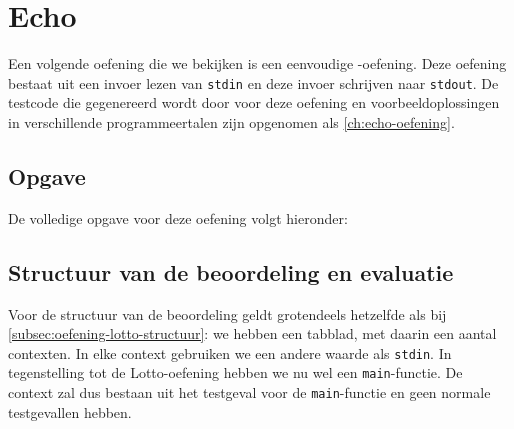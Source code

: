 \inputminted[firstline=6,lastline=50,gobble=8]{json}{sources/lotto-plan.tson}

\section{Echo}\label{sec:oefening-echo}

Een volgende oefening die we bekijken is een eenvoudige -oefening.
Deze oefening bestaat uit een invoer lezen van \texttt{stdin} en deze invoer schrijven naar \texttt{stdout}.
De testcode die gegenereerd wordt door \tested{} voor deze oefening en voorbeeldoplossingen in verschillende programmeertalen zijn opgenomen als \cref{ch:echo-oefening}.

\subsection{Opgave}\label{subsec:oefening-echo-opgave}

De volledige opgave voor deze oefening volgt hieronder:

\begin{quote}
\end{quote}

\subsection{Structuur van de beoordeling en evaluatie}\label{subsec:oefening-echo-structuur}

Voor de structuur van de beoordeling geldt grotendeels hetzelfde als bij \cref{subsec:oefening-lotto-structuur}: we hebben een tabblad, met daarin een aantal contexten.
In elke context gebruiken we een andere waarde als \texttt{stdin}.
In tegenstelling tot de Lotto-oefening hebben we nu wel een \texttt{main}-functie.
De context zal dus bestaan uit het testgeval voor de \texttt{main}-functie en geen normale testgevallen hebben.

